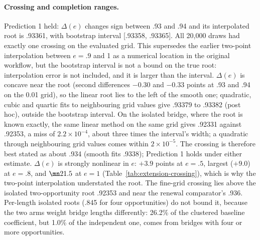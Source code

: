 \paragraph{Crossing and completion ranges.} Prediction 1 held: $\Delta(e)$
changes sign between .93 and .94 and its interpolated root is .93361, with
bootstrap interval [.93358, .93365]. All 20,000 draws had exactly one crossing
on the evaluated grid. This supersedes the earlier two-point interpolation
between $e=.9$ and 1 as a numerical location in the original workflow, but the
bootstrap interval is not a bound on the true root: interpolation error is not
included, and it is larger than the interval. $\Delta(e)$ is concave near the
root (second differences $-0.30$ and $-0.33$ points at .93 and .94 on the
0.01 grid), so the linear root lies to the left of the smooth one; quadratic,
cubic and quartic fits to neighbouring grid values give .93379 to .93382
(post hoc), outside the bootstrap interval. On the isolated bridge, where the
root is known exactly, the same linear method on the same grid gives .92331
against .92353, a miss of $2.2\times10^{-4}$, about three times the interval's
width; a quadratic through neighbouring grid values comes within
$2\times10^{-5}$. The crossing is therefore best stated as about .934 (smooth
fits .9338); Prediction 1 holds under either estimate. $\Delta(e)$ is strongly
nonlinear in $e$: $+3.9$ points at $e=.5$,
largest ($+9.0$) at $e=.8$, and $\mn21.5$ at $e=1$
(Table~\ref{tab:extension-crossing}), which is why the two-point interpolation
understated the root. The fine-grid crossing lies above the isolated
two-opportunity root .92353 and near the renewal comparator's .936. Per-length
isolated roots (.845 for four opportunities) do not bound it, because the two
arms weight bridge lengths differently: 26.2\% of the clustered baseline
coefficient, but 1.0\% of the independent one, comes from bridges with four or
more opportunities.

